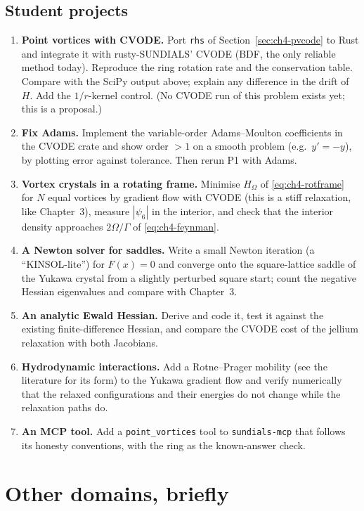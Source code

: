 \subsection{Student projects}
\begin{enumerate}[label=\textbf{P\arabic*.}]
\item \textbf{Point vortices with CVODE.} Port \texttt{rhs} of Section~\ref{sec:ch4-pvcode} to Rust and integrate it
with rusty-SUNDIALS' CVODE (BDF, the only reliable method today). Reproduce the ring rotation rate and the
conservation table. Compare with the SciPy output above; explain any difference in the drift of $H$. Add the
$1/r$-kernel control. (No CVODE run of this problem exists yet; this is a proposal.)
\item \textbf{Fix Adams.} Implement the variable-order Adams--Moulton coefficients in the CVODE crate and show
order $>1$ on a smooth problem (e.g.\ $y'=-y$), by plotting error against tolerance. Then rerun P1 with Adams.
\item \textbf{Vortex crystals in a rotating frame.} Minimise $H_\Omega$ of \eqref{eq:ch4-rotframe} for $N$ equal
vortices by gradient flow with CVODE (this is a stiff relaxation, like Chapter~3), measure $|\psi_6|$ in the
interior, and check that the interior density approaches $2\Omega/\Gamma$ of \eqref{eq:ch4-feynman}.
\item \textbf{A Newton solver for saddles.} Write a small Newton iteration (a ``KINSOL-lite'') for $F(x)=0$ and
converge onto the square-lattice saddle of the Yukawa crystal from a slightly perturbed square start; count the
negative Hessian eigenvalues and compare with Chapter~3.
\item \textbf{An analytic Ewald Hessian.} Derive and code it, test it against the existing finite-difference
Hessian, and compare the CVODE cost of the jellium relaxation with both Jacobians.
\item \textbf{Hydrodynamic interactions.} Add a Rotne--Prager mobility (see the literature for its form) to the
Yukawa gradient flow and verify numerically that the relaxed configurations and their energies do not change while
the relaxation paths do.
\item \textbf{An MCP tool.} Add a \texttt{point\_vortices} tool to \texttt{sundials-mcp} that follows its honesty
conventions, with the ring as the known-answer check.
\end{enumerate}

\section{Other domains, briefly}\label{sec:ch4-other}


